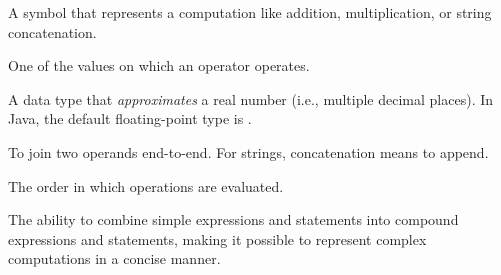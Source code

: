 \begin{description}
A symbol that represents a computation like addition, multiplication, or string concatenation.

One of the values on which an operator operates.

A data type that {\em approximates} a real number (i.e., multiple decimal places).
In Java, the default floating-point type is .

To join two operands end-to-end.
For strings, concatenation means to append.

The order in which operations are evaluated.

The ability to combine simple expressions and statements into compound expressions and statements, making it possible to represent complex computations in a concise manner.

\end{description}
